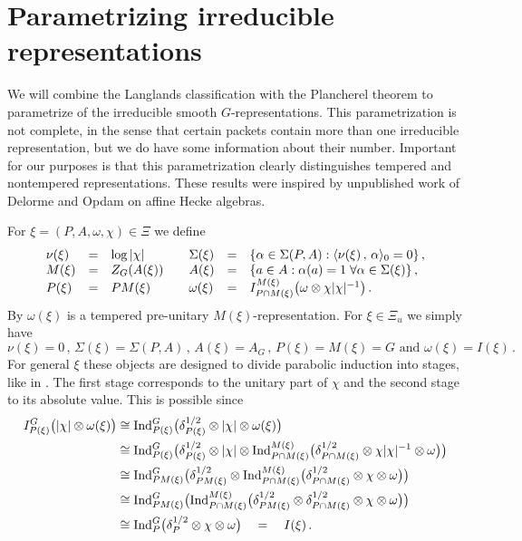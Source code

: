 \section{Parametrizing irreducible representations}
\label{sec:2.4}

We will combine the Langlands classification with the Plancherel theorem to 
parametrize of the irreducible smooth $G$-representations. This parametrization is not 
complete, in the sense that certain packets contain more than one irreducible representation, 
but we do have some information about their number. Important for our purposes is that this 
parametrization clearly distinguishes tempered and nontempered representations. 
These results were inspired by unpublished work of Delorme and Opdam \cite{DeOp2} 
on affine Hecke algebras.

For $\xi = (P,A,\omega ,\chi ) \in \Xi$ we define
\begin{equation}\label{eq:2.9}
\begin{array}{lll@{\qquad}lll}
\nu (\xi ) & = & \log |\chi| & \Sigma (\xi ) & = & \{ \alpha \in
\Sigma (P,A) : \inp{\nu (\xi )}{\alpha}_0 = 0 \} \,, \\
M(\xi ) & = & Z_G (A(\xi ))& A(\xi ) & = & \{ a \in A : \alpha (a)
= 1 \;\forall \alpha \in \Sigma (\xi) \} \,, \\
P(\xi ) & = & P M(\xi ) & \omega (\xi ) & = & I_{P \cap M(\xi
)}^{M (\xi )} \big(\omega \otimes \chi |\chi |^{-1} \big) \,.
\end{array}
\end{equation}
By \cite[Lemme III.2.3]{Wal} $\omega (\xi )$ is a tempered
pre-unitary $M (\xi )$-representation. For $\xi \in \Xi_u$ we simply have
\[
\nu (\xi ) = 0 \,,\, \Sigma (\xi ) = \Sigma (P,A) \,,\, A(\xi ) = A_G \,,\,
P(\xi ) = M(\xi ) = G \text{ and } \omega (\xi ) = I(\xi ) \,.
\]
For general $\xi$ these objects are designed to divide parabolic induction 
into stages, like in \cite[\S XI.9]{KnVo}.
The first stage corresponds to the unitary part of $\chi$ and the
second stage to its absolute value. This is possible since
\begin{align}
I_{P(\xi )}^G \big( |\chi | \otimes \omega (\xi ) \big) &\cong
\mathrm{Ind}_{P(\xi )}^G \big( \delta_{P(\xi )}^{1/2} \otimes |\chi |
\otimes \omega (\xi ) \big) \nonumber \\
&\cong \mathrm{Ind}_{P(\xi )}^G \big( \delta_{P(\xi )}^{1/2} \otimes
|\chi | \otimes \mathrm{Ind}_{P \cap M(\xi )}^{M(\xi )} \big(
\delta_{P \cap M(\xi)}^{1/2} \otimes \chi |\chi|^{-1} \otimes
\omega \big) \big) \nonumber \\
&\cong \mathrm{Ind}_{P M(\xi )}^G \big( \delta_{P M(\xi )}^{1/2}
\otimes \mathrm{Ind}_{P \cap M(\xi )}^{M(\xi )} \big( \delta_{P \cap
M(\xi)}^{1/2} \otimes \chi \otimes \omega \big) \big) \label{eq:2.10} \\
&\cong \mathrm{Ind}_{P M(\xi )}^G \big(  \mathrm{Ind}_{P \cap M(\xi
)}^{M(\xi )} \big( \delta_{P M(\xi )}^{1/2} \otimes \delta_{P
\cap M(\xi)}^{1/2} \otimes \chi \otimes \omega \big) \big) \nonumber \\
&\cong \mathrm{Ind}_P^G \big( \delta_P^{1/2} \otimes \chi \otimes
\omega \big) \quad = \quad I(\xi ) \,. \nonumber
\end{align}
